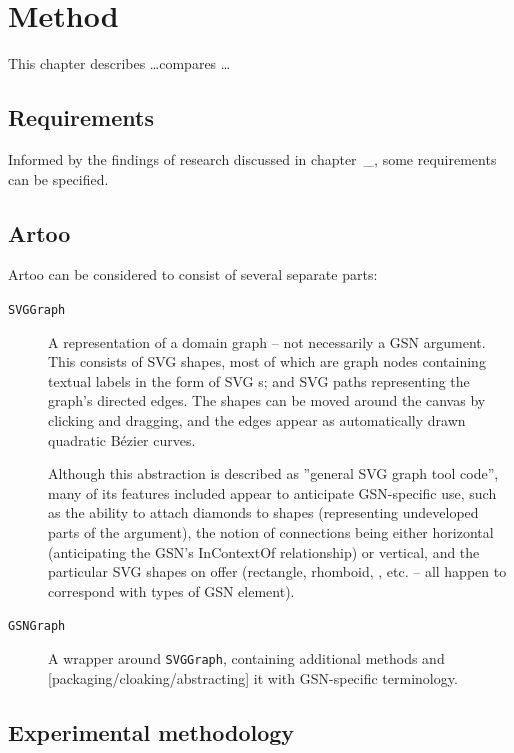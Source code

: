 \chapter{Method}

This chapter describes \ldots compares \ldots


\section{Requirements}

Informed by the findings of research discussed in chapter~\_, some requirements can be specified.





\section{Artoo}

Artoo can be considered to consist of several separate parts:

\begin{description}

\item[{\tt SVGGraph}] A representation of a domain graph -- not necessarily a GSN argument.
This consists of SVG shapes, most of which are graph nodes containing textual labels in the form of SVG {\ttForeignObject}s; and SVG paths representing the graph's directed edges.
The shapes can be moved around the canvas by clicking and dragging, and the edges appear as automatically drawn quadratic B\'{e}zier curves. 

Although this abstraction is described as ''general SVG graph tool code'', many of its features included appear to anticipate GSN-specific use, such as the ability to attach diamonds to shapes (representing undeveloped parts of the argument), the notion of connections being either horizontal (anticipating the GSN's InContextOf relationship) or vertical, and the particular SVG shapes on offer (rectangle, rhomboid, , etc. -- all happen to correspond with types of GSN element).

\item[{\tt GSNGraph}] A wrapper around {\tt SVGGraph}, containing additional methods and [packaging/cloaking/abstracting] it with GSN-specific terminology. 

\end{description}

\section{Experimental methodology}


